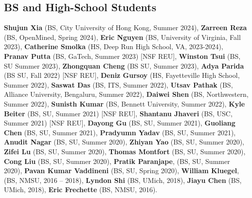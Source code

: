 \subsection*{BS and High-School Students}
  \textbf{Shujun Xia} (BS, City University of Hong Kong, Summer 2024), 
  \textbf{Zarreen Reza} (BS, OpenMined, Spring 2024), 
  \textbf{Eric Nguyen} (BS, University of Virginia, Fall 2023),
  \textbf{Catherine Smolka} (HS, Deep Run High School, VA, 2023-2024), 
  \textbf{Pranav Putta} (BS, GaTech, Summer 2023) [NSF REU],
  \textbf{Winston Tsui} (BS, SU Summer 2023),
  \textbf{Zhongquan Cheng} (BS SU, Summer 2023), 
  \textbf{Adya Parida} (BS SU, Fall 2022) [NSF REU], 
  \textbf{Deniz Gursoy} (HS, Fayetteville High School, Summer 2022), 
  \textbf{Saswat Das} (BS, ITS, Summer 2022), 
  \textbf{Utsav Pathak} (BS, Alliance University, Bengaluru, Summer 2022),
  \textbf{Daiwei Shen} (BS, Northwestern, Summer 2022),
  \textbf{Sunisth Kumar} (BS, Bennett University, Summer 2022),
  \textbf{Kyle Beiter} (BS, SU, Summer 2021) [NSF REU],  %
  \textbf{Shantanu Jhaveri} (BS, USC, Summer 2021) [NSF REU], %
  \textbf{Dayong Gu} (BS, SU, Summer 2021),
  \textbf{Guoliang Chen} (BS, SU, Summer 2021),
  \textbf{Pradyumn Yadav} (BS, SU, Summer 2021),
  \textbf{Anudit Nagar} (BS, SU, Summer 2020), 
  \textbf{Zhiyan Yao} (BS, SU, Summer 2020),
  \textbf{Zifei Lu} (BS, SU, Summer 2020),
  \textbf{Thomas Montfort} (BS, SU, Summer 2020),
  \textbf{Cong Liu} (BS, SU, Summer 2020),
  \textbf{Pratik Paranjape}, (BS, SU, Summer 2020),
  \textbf{Pavan Kumar Vaddineni} (BS, SU, Spring 2020),
  \textbf{William Kluegel}, (BS, NMSU, 2016 -- 2018), 
  \textbf{Lyndon Shi} (BS, UMich, 2018), 
  \textbf{Jiayu Chen} (BS, UMich, 2018), 
  \textbf{Eric Frechette} (BS, NMSU, 2016).
\medskip

